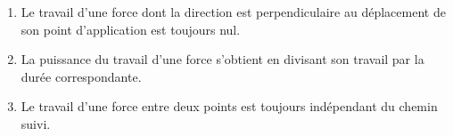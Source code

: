 \begin{enumerate}
    \item Le travail d'une force dont la direction est perpendiculaire au
          déplacement de son point d'application est toujours nul.
          \dotfill \V\F
    \item La puissance du travail d'une force s'obtient en divisant son travail
          par la durée correspondante. 
          \dotfill \V\F
    \item Le travail d'une force entre deux points est toujours indépendant du
          chemin suivi.
          \dotfill \V\F
\end{enumerate}

